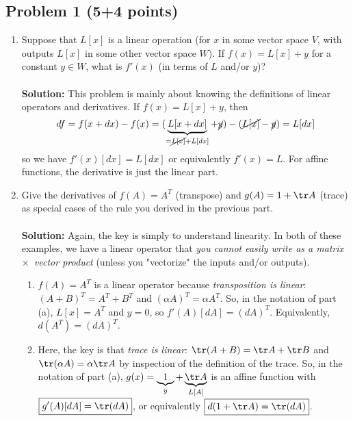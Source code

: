 \documentclass{article}
\begin{document}
\subsection*{Problem 1 (5+4 points)}


\begin{enumerate}[label=(\alph*)]

\item Suppose that $L[x]$ is a linear operation (for $x$ in some vector space $V$, with outputs $L[x]$ in some other vector space $W$).   If $f(x) = L[x] + y$ for a constant $y \in W$, what is $f'(x)$ (in terms of $L$ and/or $y$)?
\\
\\
\textbf{Solution:} 
This problem is mainly about knowing the definitions of linear operators and derivatives.   If $f(x) = L[x] + y$, then
$$
df = f(x+dx) - f(x) = (\underbrace{L[x+dx]}_{=\cancel{L[x]}+L[dx]} + \cancel{y}) - (\cancel{L[x]} - \cancel{y}) = L[dx]
$$
so we have $\boxed{f'(x)[dx] = L[dx]}$ or equivalently $\boxed{f'(x) = L}$.  For affine functions, the derivative is just the linear part.

\item Give the derivatives of $f(A) = A^T$ (transpose) and $g(A) = 1 + \tr A$ (trace) as special cases of the rule you derived in the previous part. 
\\
\\
\textbf{Solution:} Again, the key is simply to understand linearity.  In both of these examples, we have a linear operator that \emph{you cannot easily write as a matrix~$\times$~vector product} (unless you "vectorize" the inputs and/or outputs).

\begin{enumerate}[label=(\roman*)]

\item 
$f(A)=A^T$ is a linear operator because \emph{transposition is linear}: $(A+B)^T = A^T + B^T$ and $(\alpha A)^T = \alpha A^T$.  So, in the notation of part (a), $L[x]=A^T$ and $y=0$, so $\boxed{f'(A)[dA] = (dA)^T}$.  Equivalently, $\boxed{d(A^T)=(dA)^T}$.

\item Here, the key is that \emph{trace is linear}: $\tr(A+B)=\tr A + \tr B$ and $\tr(\alpha A) = \alpha \tr A$ by inspection of the definition of the trace.  So, in the notation of part (a), $g(x) = \underbrace{1}_y + \underbrace{\tr A}_{L[A]}$ is an affine function with $\boxed{g'(A)[dA] = \tr(dA)}$, or equivalently $\boxed{d(1+\tr A) = \tr(dA)}$.

\end{enumerate}

\end{enumerate}
\end{document}
